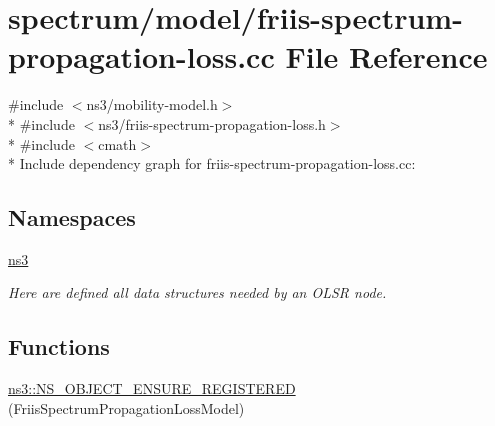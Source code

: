 \hypertarget{friis-spectrum-propagation-loss_8cc}{}\section{spectrum/model/friis-\/spectrum-\/propagation-\/loss.cc File Reference}
\label{friis-spectrum-propagation-loss_8cc}
{\ttfamily \#include $<$ns3/mobility-\/model.\+h$>$}\\*
{\ttfamily \#include $<$ns3/friis-\/spectrum-\/propagation-\/loss.\+h$>$}\\*
{\ttfamily \#include $<$cmath$>$}\\*
Include dependency graph for friis-\/spectrum-\/propagation-\/loss.cc\+:
\subsection*{Namespaces}
\begin{DoxyCompactItemize}
\item 
 \hyperlink{namespacens3}{ns3}
\begin{DoxyCompactList}\small\item\em Here are defined all data structures needed by an O\+L\+SR node. \end{DoxyCompactList}\end{DoxyCompactItemize}
\subsection*{Functions}
\begin{DoxyCompactItemize}
\item 
\hyperlink{namespacens3_a9a306174d0eea1cdfde25d72fa9271a3}{ns3\+::\+N\+S\+\_\+\+O\+B\+J\+E\+C\+T\+\_\+\+E\+N\+S\+U\+R\+E\+\_\+\+R\+E\+G\+I\+S\+T\+E\+R\+ED} (Friis\+Spectrum\+Propagation\+Loss\+Model)
\end{DoxyCompactItemize}
